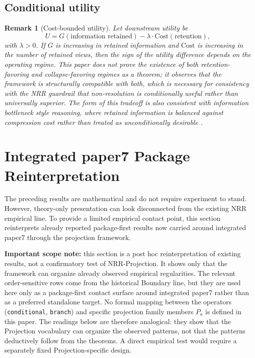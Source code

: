 \documentclass[11pt,a4paper]{article}
\newtheorem{remark}{Remark}
\begin{document}
\subsection{Conditional utility}

\begin{remark}[Cost-bounded utility]
\label{rem:utility}
Let downstream utility be
\begin{equation}
U = G(\text{information retained}) - \lambda \cdot \text{Cost}(\text{retention}),
\end{equation}
with $\lambda > 0$. If $G$ is increasing in retained information and $\text{Cost}$ is increasing in the number of retained views, then the sign of the utility difference depends on the operating regime. This paper does not prove the existence of both retention-favoring and collapse-favoring regimes as a theorem; it observes that the framework is structurally compatible with both, which is necessary for consistency with the NRR guardrail that non-resolution is conditionally useful rather than universally superior. The form of this tradeoff is also consistent with information bottleneck style reasoning, where retained information is balanced against compression cost rather than treated as unconditionally desirable \cite{tishby1999information}.
\end{remark}

\section{Integrated paper7 Package Reinterpretation}
\label{sec:boundary}

The preceding results are mathematical and do not require experiment to stand. However, theory-only presentation can look disconnected from the existing NRR empirical line. To provide a limited empirical contact point, this section reinterprets already reported package-first results now carried around integrated paper7 \cite{saito2026boundary} through the projection framework.

\textbf{Important scope note:} this section is a post hoc reinterpretation of existing results, not a confirmatory test of NRR-Projection. It shows only that the framework can organize already observed empirical regularities. The relevant order-sensitive rows come from the historical Boundary line, but they are used here only as a package-first contact surface around integrated paper7 rather than as a preferred standalone target. No formal mapping between the operators (\texttt{conditional}, \texttt{branch}) and specific projection family members $P_a$ is defined in this paper. The readings below are therefore analogical: they show that the Projection vocabulary can organize the observed patterns, not that the patterns deductively follow from the theorems. A direct empirical test would require a separately fixed Projection-specific design.
\end{document}
